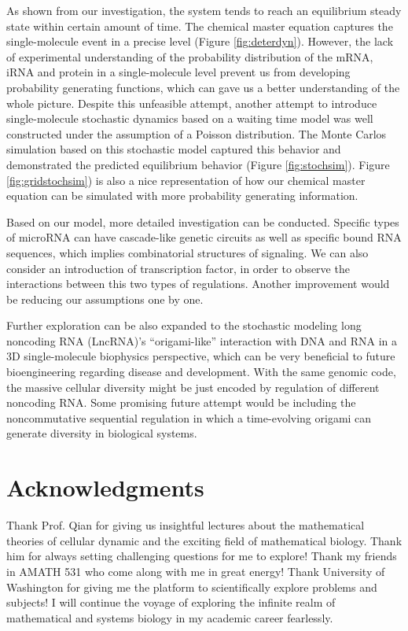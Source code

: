 \documentclass[fleqn,10pt]{wlscirep}
\begin{document}
As shown from our investigation, the system tends to reach an equilibrium steady state within certain amount of time. The chemical master equation captures the single-molecule event in a precise level (Figure \ref{fig:deterdyn}). However, the lack of experimental understanding of the probability distribution of the mRNA, iRNA and protein in a single-molecule level prevent us from developing probability generating functions, which can gave us a better understanding of the whole picture. Despite this unfeasible attempt, another attempt to introduce single-molecule stochastic dynamics based on a waiting time model was well constructed under the assumption of a Poisson distribution. The Monte Carlos simulation based on this stochastic model captured this behavior and demonstrated the predicted equilibrium behavior (Figure \ref{fig:stochsim}). Figure \ref{fig:gridstochsim}) is also a nice representation of how our chemical master equation can be simulated with more probability generating information.

Based on our model, more detailed investigation can be conducted. Specific types of microRNA can have cascade-like genetic circuits as well as specific bound RNA sequences, which implies combinatorial structures of signaling. We can also consider an introduction of transcription factor, in order to observe the interactions between this two types of regulations. Another improvement would be reducing our assumptions one by one.

Further exploration can be also expanded to the stochastic modeling long noncoding RNA (LncRNA)’s “origami-like” interaction with DNA and RNA in a 3D single-molecule biophysics perspective, which can be very beneficial to future bioengineering regarding disease and development. With the same genomic code, the massive cellular diversity might be just encoded by regulation of different noncoding RNA. Some promising future attempt would be including the noncommutative sequential regulation in which a time-evolving origami can generate diversity in biological systems.



\section*{Acknowledgments}

Thank Prof. Qian for giving us insightful lectures about the mathematical theories of cellular dynamic and the exciting field of mathematical biology. Thank him for always setting challenging questions for me to explore! Thank my friends in AMATH 531 who come along with me in great energy! Thank University of Washington for giving me the platform to scientifically explore problems and subjects! I will continue the voyage of exploring the infinite realm of mathematical and systems biology in my academic career fearlessly.
\end{document}
